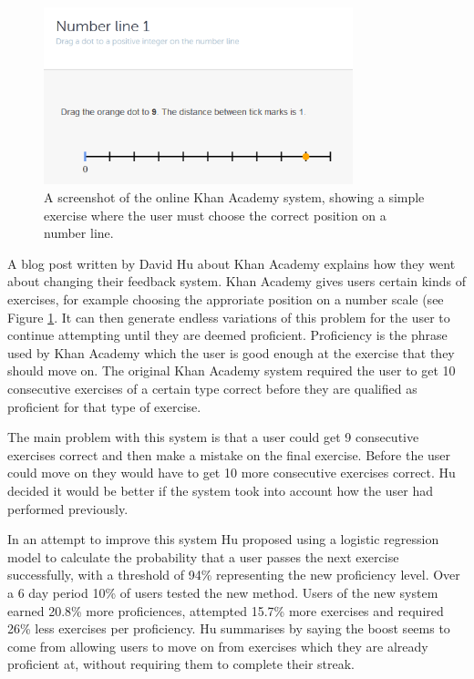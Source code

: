 \begin{figure}[h!]
\centering
\includegraphics[width=0.8\textwidth]{images/kascreenshot.png}
\caption{A screenshot of the online Khan Academy system, showing a simple exercise where the user must choose the correct position on a number line.}
\label{fig:kascreenshot}
\end{figure}

A blog post\cite{khan_blog} written by David Hu about Khan Academy explains how they went about changing their feedback system. Khan Academy gives users certain kinds of exercises, for example choosing the approriate position on a number scale (see Figure \ref{fig:kascreenshot}. It can then generate endless variations of this problem for the user to continue attempting until they are deemed proficient. Proficiency is the phrase used by Khan Academy which the user is good enough at the exercise that they should move on. The original Khan Academy system required the user to get 10 consecutive exercises of a certain type correct before they are qualified as proficient for that type of exercise. 

The main problem with this system is that a user could get 9 consecutive exercises correct and then make a mistake on the final exercise. Before the user could move on they would have to get 10 more consecutive exercises correct. Hu decided it would be better if the system took into account how the user had performed previously. 

In an attempt to improve this system Hu proposed using a logistic regression model to calculate the probability that a user passes the next exercise successfully, with a threshold of 94\% representing the new proficiency level. Over a 6 day period 10\% of users tested the new method. Users of the new system earned 20.8\% more proficiences, attempted 15.7\% more exercises and required 26\% less exercises per proficiency. Hu summarises by saying the boost seems to come from allowing users to move on from exercises which they are already proficient at, without requiring them to complete their streak.


